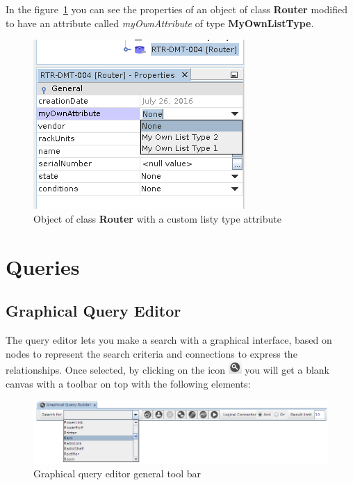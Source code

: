 \documentclass[a4paper]{article}
\begin{document}
	 In the figure~\ref{fig:list_type_applied_types} you can see the properties of an object of class \textbf{Router} modified to have an attribute called \textit{myOwnAttribute} of type \textbf{MyOwnListType}.\newline
	 \begin{figure}[h!]
	 	\centering
	 	\includegraphics[width=0.4\linewidth]{img/list_type_applied_types.png}
	 	\caption{Object of class \textbf{Router} with a custom listy type attribute}
	 	\label{fig:list_type_applied_types}
	 \end{figure}
	 
	\newpage	
	\section{Queries} \label{sec:querying}
	\subsection{Graphical Query Editor} 
	The query editor lets you make a search with a graphical interface, based on nodes to represent the search criteria and connections to express the relationships. Once selected, by clicking on the icon \includegraphics[width=0.5cm]{img/icon_query_manager.png} you will get a blank canvas with a toolbar on top with the following elements:
	\begin{figure}[h!]
		\centering
		\includegraphics[width=1.1\linewidth]{img/query_tool_bar.png}
		\caption{Graphical query editor general tool bar}
		\label{fig:query_tool_bar}
	\end{figure}
	
\end{document}
